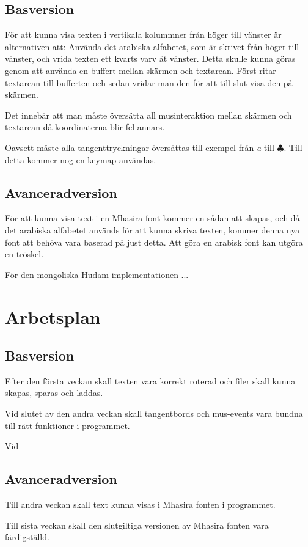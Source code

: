 \documentclass[a4paper,11p,twoside]{report}
\begin{document}
\subsection{Basversion}
För att kunna visa texten i vertikala kolummner från höger till vänster är alternativen att:
Använda det arabiska alfabetet, som är skrivet från höger till vänster, och vrida texten ett kvarts varv åt vänster. Detta skulle kunna göras genom att använda en buffert mellan skärmen och textarean. Först ritar textarean till bufferten och sedan vridar man den för att till slut visa den på skärmen.

Det innebär att man måste översätta all musinteraktion mellan skärmen och textarean då koordinaterna blir fel annars.

Oavsett måste alla tangenttryckningar översättas till exempel från \emph{a} till \emph{$\clubsuit$}. Till detta kommer nog en keymap användas.

\subsection{Avanceradversion}
För att kunna visa text i en Mhasira font kommer en sådan att skapas, och då det arabiska alfabetet används för att kunna skriva texten, kommer denna nya font att behöva vara baserad på just detta. Att göra en arabisk font kan utgöra en tröskel.

För den mongoliska Hudam implementationen ...

\section{Arbetsplan}
\subsection{Basversion}
Efter den första veckan skall texten vara korrekt roterad och filer skall kunna skapas, sparas och laddas.

Vid slutet av den andra veckan skall tangentbords och mus-events vara bundna till rätt funktioner i programmet.

Vid 


\subsection{Avanceradversion}

Till andra veckan skall text kunna visas i Mhasira fonten i programmet.

Till sista veckan skall den slutgiltiga versionen av Mhasira fonten vara färdigställd.
\end{document}
